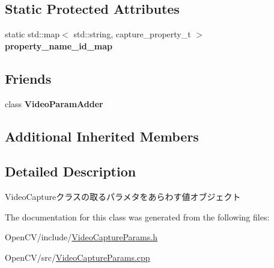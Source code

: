 \subsection*{Static Protected Attributes}
\begin{DoxyCompactItemize}
\item 
\hypertarget{classskl_1_1_video_capture_params_adf62f7037731cc3085a036fbe2ed5b06}{}\label{classskl_1_1_video_capture_params_adf62f7037731cc3085a036fbe2ed5b06} 
static std\+::map$<$ std\+::string, capture\+\_\+property\+\_\+t $>$ {\bfseries property\+\_\+name\+\_\+id\+\_\+map}
\end{DoxyCompactItemize}
\subsection*{Friends}
\begin{DoxyCompactItemize}
\item 
\hypertarget{classskl_1_1_video_capture_params_a05c26b898da174ea1187ea51676f2517}{}\label{classskl_1_1_video_capture_params_a05c26b898da174ea1187ea51676f2517} 
class {\bfseries Video\+Param\+Adder}
\end{DoxyCompactItemize}
\subsection*{Additional Inherited Members}


\subsection{Detailed Description}
Video\+Captureクラスの取るパラメタをあらわす値オブジェクト 

The documentation for this class was generated from the following files\+:\begin{DoxyCompactItemize}
\item 
Open\+C\+V/include/\hyperlink{_video_capture_params_8h}{Video\+Capture\+Params.\+h}\item 
Open\+C\+V/src/\hyperlink{_video_capture_params_8cpp}{Video\+Capture\+Params.\+cpp}\end{DoxyCompactItemize}
